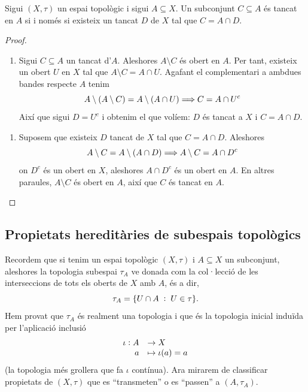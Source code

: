\documentclass[../main.tex]{subfiles}
\begin{document}
\begin{ter}
\label{ter:subespaitopologic1} Sigui $(X,\tau)$ un espai topològic i sigui $A\subseteq X$. Un subconjunt $C\subseteq A$ és tancat en $A$ si i només si existeix un tancat $D$ de $X$ tal que $C = A\cap D$.
\end{ter}
\begin{proof}
\begin{enumerate}[($\Rightarrow$)]
    \item Sigui $C\subseteq A$ un tancat d'$A$. Aleshores $A\setminus C$ és obert en $A$. Per tant, existeix un obert $U$ en $X$ tal que $A\setminus C = A\cap U$. Agafant el complementari a ambdues bandes respecte $A$ tenim
    \begin{equation}
        \notag
        A\setminus(A\setminus C) = A\setminus(A\cap U)\Longrightarrow C = A\cap U^c
    \end{equation}
    Així que sigui $D = U^c$ i obtenim el que volíem: $D$ és tancat a $X$ i $C = A\cap D$.
\end{enumerate}
\begin{enumerate}[($\Leftarrow$)]
    \item Suposem que existeix $D$ tancat de $X$ tal que $C = A\cap D$. Aleshores
    \begin{equation}
        \notag
        A\setminus C = A\setminus(A\cap D)\Longrightarrow A\setminus C = A\cap D^c
    \end{equation}
    on $D^c$ és un obert en $X$, aleshores $A\cap D^c$ és un obert en $A$. En altres paraules, $A\setminus C$ és obert en $A$, així que $C$ és tancat en $A$.
\end{enumerate}
\end{proof}

\subsection{Propietats hereditàries de subespais topològics}

Recordem que si tenim un espai topològic $(X,\tau)$ i $A\subseteq X$ un subconjunt, aleshores la topologia subespai $\tau_A$ ve donada com la col·lecció de les interseccions de tots els oberts de $X$ amb $A$, és a dir,
\begin{equation}
    \notag
    \tau_A = \{U\cap A\;:\;U\in\tau\} .
\end{equation}
Hem provat que $\tau_A$ és realment una topologia i que és la topologia inicial induïda per l'aplicació inclusió 
\begin{equation}
    \notag
    \begin{array}{rl}
        \iota:A & \rightarrow X \\
        a & \mapsto \iota(a) = a
    \end{array}
\end{equation}
(la topologia més grollera que fa $\iota$ contínua). Ara mirarem de classificar propietats de $(X,\tau)$ que es ``transmeten'' o es ``passen'' a $(A,\tau_A)$.
\end{document}
